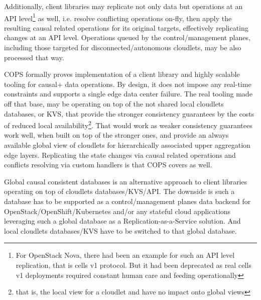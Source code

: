 \documentclass[conference]{IEEEtran}
\begin{document}
Additionally, client libraries may replicate not only data but operations at an
API level\footnote{For OpenStack Nova, there had been an example for such an
API level replication, that is cells v1 protocol. But it had been deprecated as
real cells v1 deployments required constant human care and feeding
operationally} as well, i.e. resolve conflicting operations on-fly, then apply
the resulting causal related operations for its original targets, effectively
replicating changes at an API level. Operations queued by the control/management planes, including
those targeted for disconnected/autonomous cloudlets, may be also processed
that way.

COPS formally proves implementation of a client library and highly scalable
tooling for causal+ data operations. By design, it does not impose any
real-time constraints and supports a single edge data center failure. The real
tooling made off that base, may be operating on top of the not shared local
cloudlets databases, or KVS, that provide the stronger consistency guarantees
by the costs of reduced local availability\footnote{that is, the local view for
a cloudlet and have no impact onto global views}. That would work as weaker
consistency guarantees work well, when built on top of the stronger ones, and
provide an always available global view of cloudlets for hierarchically
associated upper aggregation edge layers. Replicating the state changes via
causal related operations and conflicts resolving via custom handlers is that
COPS covers as well.

Global causal consistent databases\cite{b6} is an alternative approach to
client libraries operating on top of cloudlets databases/KVS/API. The downside
is such a database has to be supported as a control/management planes data
backend for OpenStack/OpenShift/Kubernetes and/or any stateful cloud
applications leveraging such a global database as a Replication-as-a-Service
solution. And local cloudlets databases/KVS have to be switched to that global
database.
\end{document}
